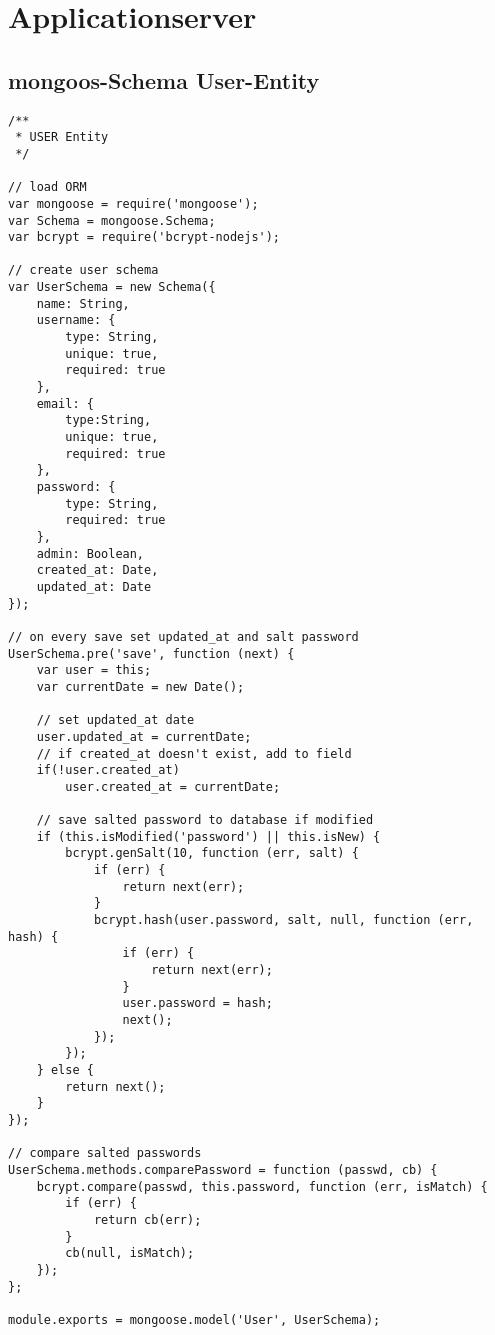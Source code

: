 \section{Applicationserver}
\subsection{mongoos-Schema User-Entity}
\label{subsub_a2_mongoose-schema}

\begin{lstlisting}[caption={Mongoose Schema der User-Entity},label={lst_a2_model-user}, frame=single]
/**
 * USER Entity
 */

// load ORM
var mongoose = require('mongoose');
var Schema = mongoose.Schema;
var bcrypt = require('bcrypt-nodejs');

// create user schema
var UserSchema = new Schema({
    name: String,
    username: {
        type: String,
        unique: true,
        required: true
    },
    email: {
        type:String,
        unique: true,
        required: true
    },
    password: {
        type: String,
        required: true
    },
    admin: Boolean,
    created_at: Date,
    updated_at: Date
});

// on every save set updated_at and salt password
UserSchema.pre('save', function (next) {
    var user = this;
    var currentDate = new Date();

    // set updated_at date
    user.updated_at = currentDate;
    // if created_at doesn't exist, add to field
    if(!user.created_at)
        user.created_at = currentDate;

    // save salted password to database if modified
    if (this.isModified('password') || this.isNew) {
        bcrypt.genSalt(10, function (err, salt) {
            if (err) {
                return next(err);
            }
            bcrypt.hash(user.password, salt, null, function (err, hash) {
                if (err) {
                    return next(err);
                }
                user.password = hash;
                next();
            });
        });
    } else {
        return next();
    }
});

// compare salted passwords
UserSchema.methods.comparePassword = function (passwd, cb) {
    bcrypt.compare(passwd, this.password, function (err, isMatch) {
        if (err) {
            return cb(err);
        }
        cb(null, isMatch);
    });
};

module.exports = mongoose.model('User', UserSchema);
\end{lstlisting}

